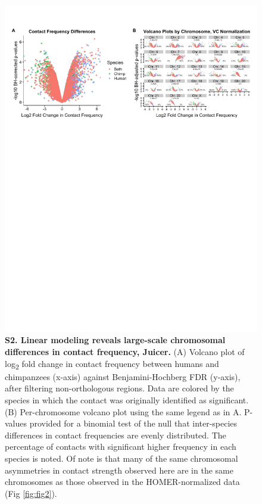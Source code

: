\begin{figure}[!htb]
\centering
\includegraphics[width=6in]{img/figS2.pdf}
\caption[Linear modeling reveals large-scale chromosomal differences in contact frequency, Juicer.]{\textbf{S2. Linear modeling reveals large-scale chromosomal differences in contact frequency, Juicer.} (A) Volcano plot of log\textsubscript{2} fold change in contact frequency between humans and chimpanzees (x-axis) against Benjamini-Hochberg FDR (y-axis), after filtering non-orthologous regions. Data are colored by the species in which the contact was originally identified as significant. (B) Per-chromosome volcano plot using the same legend as in A. P-values provided for a binomial test of the null that inter-species differences in contact frequencies are evenly distributed. The percentage of contacts with significant higher frequency in each species is noted. Of note is that many of the same chromosomal asymmetries in contact strength observed here are in the same chromosomes as those observed in the HOMER-normalized data (Fig \ref{fig:fig2}).}
\label{fig:figS2}
\end{figure}

